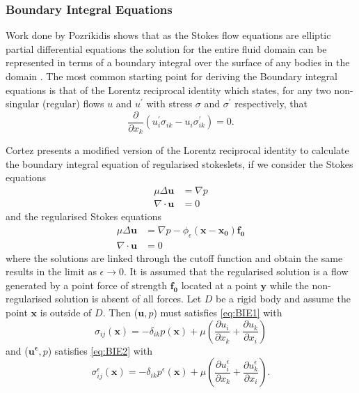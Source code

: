 \subsubsection{Boundary Integral Equations}
Work done by Pozrikidis \cite{Pozrikidis1992BoundaryFlow} shows that as the Stokes flow equations are elliptic partial differential equations the solution for the entire fluid domain can be represented in terms of a boundary integral over the surface of any bodies in the domain \cite{Stakgold1968Boundary2}. The most common starting point for deriving the Boundary integral equations is that of the Lorentz reciprocal identity which states, for any two non-singular (regular) flows $u$ and $u^\prime$ with stress $\sigma$ and $\sigma^\prime$ respectively, that
\begin{equation*}
    \frac{\partial}{\partial x_k}(u_i^\prime\sigma_{ik} - u_i \sigma^\prime_{ik}) = 0.
\end{equation*}

Cortez presents a modified version of the Lorentz reciprocal identity to calculate the boundary integral equation of regularised stokeslets, if we consider the Stokes equations
\begin{equation}
    \label{eq:BIE1}
\begin{aligned}
      \mu\Delta\boldsymbol{u} &= \nabla p \\
      \nabla \cdot \boldsymbol{u} &= 0
\end{aligned}
\end{equation}
and the regularised Stokes equations
\begin{equation}
    \label{eq:BIE2}
\begin{aligned}
      \mu\Delta\boldsymbol{u} &= \nabla p - \phi_{\epsilon}(\bm{x}-\bm{x_0})\bm{f_0} \\
      \nabla \cdot \boldsymbol{u} &= 0
\end{aligned}
\end{equation}
where the solutions are linked through the cutoff function and obtain the same results in the limit as $\epsilon \to 0$. It is assumed that the regularised solution is a flow generated by a point force of strength $\bm{f_0}$ located at a point $\bm{y}$ while the non-regularised solution is absent of all forces. Let $D$ be a rigid body and assume the point $\bm{x}$ is outside of $D$. Then ($\bm{u},p$) must satisfies \cref{eq:BIE1} with
\begin{equation*}
\sigma_{ij}(\bm{x}) = -\delta_{ik}p(\bm{x}) + \mu\left( \frac{\partial u_i}{\partial x_k} + \frac{\partial u_k}{\partial x_i} \right)
\end{equation*}
and ($\bm{u^\epsilon},p$) satisfies \cref{eq:BIE2} with
\begin{equation*}
\sigma^\epsilon_{ij}(\bm{x}) = -\delta_{ik}p^\epsilon(\bm{x}) + \mu\left( \frac{\partial u^\epsilon_i}{\partial x_k} + \frac{\partial u^\epsilon_k}{\partial x_i} \right).
\end{equation*}

